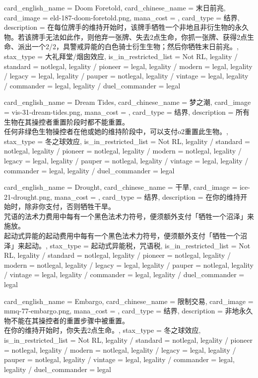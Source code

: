 \documentclass[lang = cn, color = black, 10pt]{AllThatStax}
\begin{document}
\card
{
	card_english_name = {Doom Foretold},
	card_chinese_name = {末日前兆},
	card_image = eld-187-doom-foretold.png,
	mana_cost = ,
	card_type = 结界,
	description = {在每位牌手的维持开始时，该牌手牺牲一个非地且非衍生物的永久物。若该牌手无法如此作，则他弃一张牌、失去2点生命，你抓一张牌、获得2点生命、派出一个2/2，具警戒异能的白色骑士衍生生物；然后你牺牲末日前兆。},
	stax_type = 大礼拜堂/烟囱效应,
	is_in_restricted_list = Not RL,
	legality / standard = notlegal,
	legality / pioneer = legal,
	legality / modern = legal,
	legality / legacy = legal,
	legality / pauper = notlegal,
	legality / vintage = legal,
	legality / commander = legal,
	legality / duel_commander = legal
}

\card
{
	card_english_name = {Dream Tides},
	card_chinese_name = {梦之潮},
	card_image = vis-31-dream-tides.png,
	mana_cost = ,
	card_type = 结界,
	description = {所有生物在其操控者重置阶段时都不能重置。\\
任何非绿色生物操控者在他或她的维持阶段中，可以支付o2重置此生物。},
	stax_type = 冬之球效应,
	is_in_restricted_list = Not RL,
	legality / standard = notlegal,
	legality / pioneer = notlegal,
	legality / modern = notlegal,
	legality / legacy = legal,
	legality / pauper = notlegal,
	legality / vintage = legal,
	legality / commander = legal,
	legality / duel_commander = legal
}

\card
{
	card_english_name = {Drought},
	card_chinese_name = {干旱},
	card_image = ice-21-drought.png,
	mana_cost = ,
	card_type = 结界,
	description = {在你的维持开始时，除非你支付，否则牺牲干旱。\\
咒语的法术力费用中每有一个黑色法术力符号，便须额外支付「牺牲一个沼泽」来施放。\\
起动式异能的起动费用中每有一个黑色法术力符号，便须额外支付「牺牲一个沼泽」来起动。},
	stax_type = 起动式异能税，咒语税,
	is_in_restricted_list = Not RL,
	legality / standard = notlegal,
	legality / pioneer = notlegal,
	legality / modern = notlegal,
	legality / legacy = legal,
	legality / pauper = notlegal,
	legality / vintage = legal,
	legality / commander = legal,
	legality / duel_commander = legal
}

\card
{
	card_english_name = {Embargo},
	card_chinese_name = {限制交易},
	card_image = mmq-77-embargo.png,
	mana_cost = ,
	card_type = 结界,
	description = {非地永久物不能在其操控者的重置步骤中被重置。\\
在你的维持开始时，你失去2点生命。},
	stax_type = 冬之球效应,
	is_in_restricted_list = Not RL,
	legality / standard = notlegal,
	legality / pioneer = notlegal,
	legality / modern = notlegal,
	legality / legacy = legal,
	legality / pauper = notlegal,
	legality / vintage = legal,
	legality / commander = legal,
	legality / duel_commander = legal
}
\end{document}
